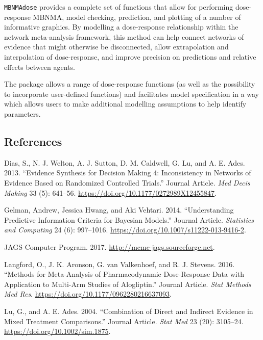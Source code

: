 \documentclass[]{article}
\begin{document}
\texttt{MBNMAdose} provides a complete set of functions that allow for
performing dose-response MBNMA, model checking, prediction, and plotting
of a number of informative graphics. By modelling a dose-response
relationship within the network meta-analysis framework, this method can
help connect networks of evidence that might otherwise be disconnected,
allow extrapolation and interpolation of dose-response, and improve
precision on predictions and relative effects between agents.

The package allows a range of dose-response functions (as well as the
possibility to incorporate user-defined functions) and facilitates model
specification in a way which allows users to make additional modelling
assumptions to help identify parameters.

\hypertarget{references}{%
\subsection*{References}\label{references}}

\hypertarget{refs}{}
\leavevmode\hypertarget{ref-dias2013}{}%
Dias, S., N. J. Welton, A. J. Sutton, D. M. Caldwell, G. Lu, and A. E.
Ades. 2013. ``Evidence Synthesis for Decision Making 4: Inconsistency in
Networks of Evidence Based on Randomized Controlled Trials.'' Journal
Article. \emph{Med Decis Making} 33 (5): 641--56.
\url{https://doi.org/10.1177/0272989X12455847}.

\leavevmode\hypertarget{ref-gelman2014}{}%
Gelman, Andrew, Jessica Hwang, and Aki Vehtari. 2014. ``Understanding
Predictive Information Criteria for Bayesian Models.'' Journal Article.
\emph{Statistics and Computing} 24 (6): 997--1016.
\url{https://doi.org/10.1007/s11222-013-9416-2}.

\leavevmode\hypertarget{ref-jags}{}%
JAGS Computer Program. 2017. \url{http://mcmc-jags.sourceforge.net}.

\leavevmode\hypertarget{ref-langford2016}{}%
Langford, O., J. K. Aronson, G. van Valkenhoef, and R. J. Stevens. 2016.
``Methods for Meta-Analysis of Pharmacodynamic Dose-Response Data with
Application to Multi-Arm Studies of Alogliptin.'' Journal Article.
\emph{Stat Methods Med Res}.
\url{https://doi.org/10.1177/0962280216637093}.

\leavevmode\hypertarget{ref-lu2004}{}%
Lu, G., and A. E. Ades. 2004. ``Combination of Direct and Indirect
Evidence in Mixed Treatment Comparisons.'' Journal Article. \emph{Stat
Med} 23 (20): 3105--24. \url{https://doi.org/10.1002/sim.1875}.
\end{document}
